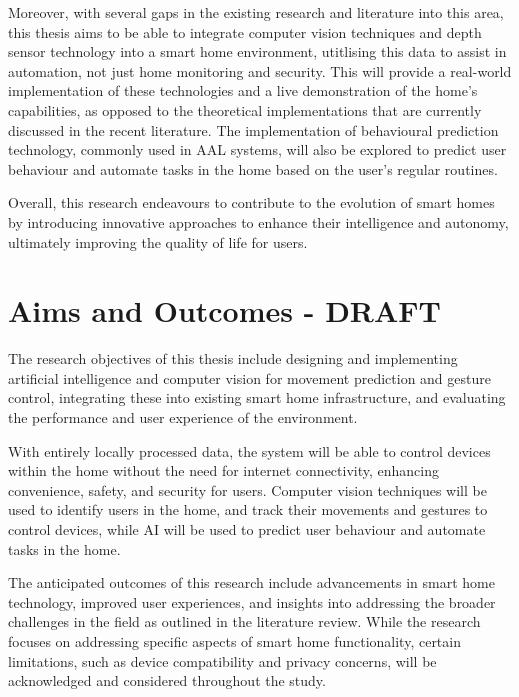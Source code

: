 Moreover, with several gaps in the existing research and literature into this area, this thesis aims to be able to integrate computer vision techniques and depth sensor technology into a smart home environment, utitlising this data to assist in automation, not just home monitoring and security.
This will provide a real-world implementation of these technologies and a live demonstration of the home's capabilities, as opposed to the theoretical implementations that are currently discussed in the recent literature.
The implementation of behavioural prediction technology, commonly used in AAL systems, will also be explored to predict user behaviour and automate tasks in the home based on the user's regular routines.

Overall, this research endeavours to contribute to the evolution of smart homes by introducing innovative approaches to enhance their intelligence and autonomy, ultimately improving the quality of life for users.

\section{Aims and Outcomes - DRAFT}
The research objectives of this thesis include designing and implementing artificial intelligence and computer vision for movement prediction and gesture control, integrating these into existing smart home infrastructure, and evaluating the performance and user experience of the environment.

With entirely locally processed data, the system will be able to control devices within the home without the need for internet connectivity, enhancing convenience, safety, and security for users.
Computer vision techniques will be used to identify users in the home, and track their movements and gestures to control devices, while AI will be used to predict user behaviour and automate tasks in the home.

The anticipated outcomes of this research include advancements in smart home technology, improved user experiences, and insights into addressing the broader challenges in the field as outlined in the literature review.
While the research focuses on addressing specific aspects of smart home functionality, certain limitations, such as device compatibility and privacy concerns, will be acknowledged and considered throughout the study.

